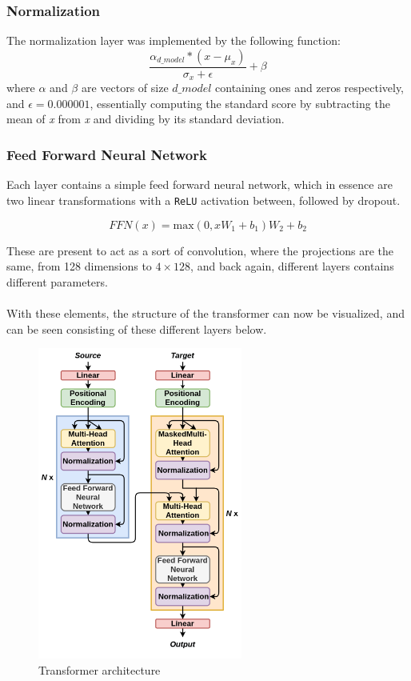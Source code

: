 \documentclass[main.tex]{subfiles}
\begin{document}
\subsubsection{Normalization}
The normalization layer was implemented by the following function:
$$ \frac{\alpha_{d\_model} * (x - \mu_x)}{\sigma_{x}+\epsilon} + \beta$$
where $\alpha$ and  $\beta$ are vectors of size $d\_model$ containing ones and zeros respectively, and $\epsilon = 0.000001$, essentially computing the standard score by subtracting the mean of \textit{x} from \textit{x} and dividing by its standard deviation. 

\subsubsection{Feed Forward Neural Network}
Each layer contains a simple feed forward neural network, which in essence are two linear transformations with a \texttt{ReLU} activation between, followed by dropout. 

$$FFN(x) = \text{max}(0, xW_1 + b_1)W_2 + b_2 $$

These are present to act as a sort of convolution, where the projections are the same, from 128 dimensions to $4 \times 128$, and back again, different layers contains different parameters\cite{Attention}.\\
\\
With these elements, the structure of the transformer can now be visualized, and can be seen consisting of these different layers below. 

\begin{figure}[H]
    \centering
    \includegraphics[width=0.6\textwidth]{Figures/transformerarchitecture.png}
    \caption{Transformer architecture}
    \label{fig:transformer_architecture}
\end{figure}
\end{document}
